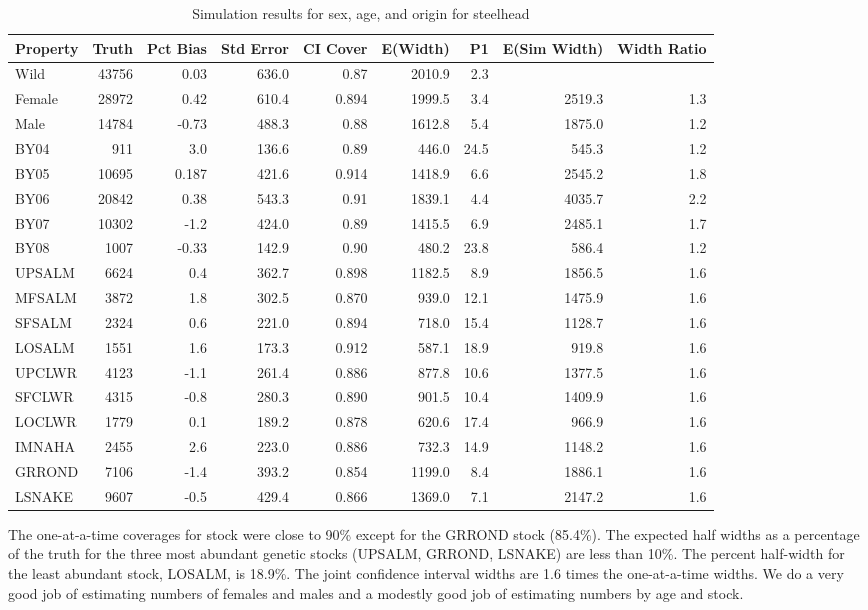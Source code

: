 \documentclass[11pt]{article}
\begin{document}
\begin{table} %
\caption{Simulation results for sex, age, and origin for steelhead}
\label{table:SHsimresults}
\footnotesize
\begin{tabular}{ | l | r | r | r | r | r | r | r | r | }
\hline
Property&Truth&Pct Bias&Std Error&CI Cover&E(Width)&P1&E(Sim Width)&Width Ratio \\ \hline
Wild&43756&0.03&636.0&0.87&2010.9&2.3&& \\ \hline
Female&28972&0.42&610.4&0.894&1999.5&3.4&2519.3&1.3 \\ \hline
Male&14784&-0.73&488.3&0.88&1612.8&5.4&1875.0&1.2 \\ \hline
BY04&911&3.0&136.6&0.89&446.0&24.5&545.3&1.2 \\ \hline
BY05&10695&0.187&421.6&0.914&1418.9&6.6&2545.2&1.8 \\ \hline
BY06&20842&0.38&543.3&0.91&1839.1&4.4&4035.7&2.2 \\ \hline
BY07&10302&-1.2&424.0&0.89&1415.5&6.9&2485.1&1.7 \\ \hline
BY08&1007&-0.33&142.9&0.90&480.2&23.8&586.4&1.2 \\ \hline
UPSALM&6624&0.4&362.7&0.898&1182.5&8.9&1856.5&1.6 \\ \hline
MFSALM&3872&1.8&302.5&0.870&939.0&12.1&1475.9&1.6 \\ \hline
SFSALM&2324&0.6&221.0&0.894&718.0&15.4&1128.7&1.6 \\ \hline
LOSALM&1551&1.6&173.3&0.912&587.1&18.9&919.8&1.6 \\ \hline
UPCLWR&4123&-1.1&261.4&0.886&877.8&10.6&1377.5&1.6 \\ \hline
SFCLWR&4315&-0.8&280.3&0.890&901.5&10.4&1409.9&1.6 \\ \hline
LOCLWR&1779&0.1&189.2&0.878&620.6&17.4&966.9&1.6 \\ \hline
IMNAHA&2455&2.6&223.0&0.886&732.3&14.9&1148.2&1.6 \\ \hline
GRROND&7106&-1.4&393.2&0.854&1199.0&8.4&1886.1&1.6 \\ \hline
LSNAKE&9607&-0.5&429.4&0.866&1369.0&7.1&2147.2&1.6 \\ \hline
\end{tabular}
\end{table}

The one-at-a-time coverages for stock were close to 90\% except for the GRROND stock (85.4\%). The expected half widths as a percentage of the truth for the three most abundant genetic stocks (UPSALM, GRROND, LSNAKE) are less than 10\%. The percent half-width for the least abundant stock, LOSALM, is 18.9\%.  The joint confidence interval widths are 1.6 times the one-at-a-time widths.  We do a very good job of estimating numbers of females and males and a modestly good job of estimating numbers by age and stock.
\end{document}

